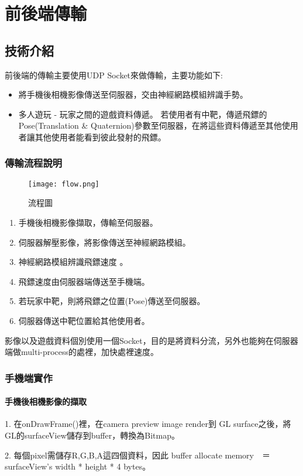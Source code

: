 \chapter{前後端傳輸}
\section{技術介紹}
前後端的傳輸主要使用UDP Socket來做傳輸，主要功能如下:
\begin{itemize}
\item 將手機後相機影像傳送至伺服器，交由神經網路模組辨識手勢。
\item 多人遊玩 - 玩家之間的遊戲資料傳遞。 
若使用者有中靶，傳遞飛鏢的Pose(Translation \& Quaternion)參數至伺服器，在將這些資料傳遞至其他使用者讓其他使用者能看到彼此發射的飛鏢。
\end{itemize}
\subsection{傳輸流程說明}
\begin{figure}[h]
    \centering	
    \texttt{[image: flow.png]}
    \caption{流程圖}
    \label{fig:flow}
\end{figure}
\begin{enumerate}
\item 手機後相機影像擷取，傳輸至伺服器。
\item 伺服器解壓影像，將影像傳送至神經網路模組。
\item 神經網路模組辨識飛鏢速度 。
\item 飛鏢速度由伺服器端傳送至手機端。
\item 若玩家中靶，則將飛鏢之位置(Pose)傳送至伺服器。
\item 伺服器傳送中靶位置給其他使用者。
\end{enumerate}

影像以及遊戲資料個別使用一個Socket，目的是將資料分流，另外也能夠在伺服器端做multi-process的處裡，加快處裡速度。
\subsection{手機端實作}
\subsubsection{手機後相機影像的擷取}
1. 在onDrawFrame()裡，在camera preview image render到 GL surface之後，將GL的surfaceView儲存到buffer，轉換為Bitmap。

2. 每個pixel需儲存R,G,B,A這四個資料，因此 buffer allocate memory　＝　surfaceView’s width * height * 4 bytes。

